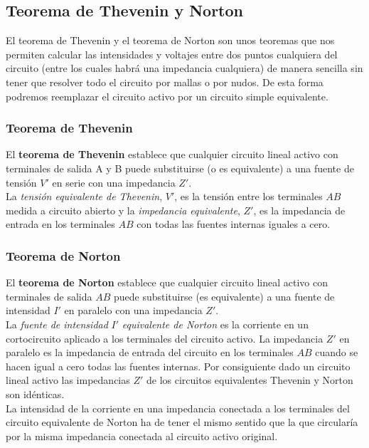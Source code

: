 \documentclass[12pt,a4paper]{article}
\begin{document}
\subsection{Teorema de Thevenin y Norton}

El teorema de Thevenin y el teorema de Norton son unos teoremas que nos permiten calcular las intensidades y voltajes entre dos puntos cualquiera del circuito (entre los cuales habrá una impedancia cualquiera) de manera sencilla sin tener que resolver todo el circuito por mallas o por nudos. De esta forma podremos reemplazar el circuito activo por un circuito simple equivalente. 

\subsubsection{Teorema de Thevenin}

El \textbf{teorema de Thevenin} establece que cualquier circuito lineal activo con terminales de salida A y B puede substituirse (o es equivalente) a una fuente de tensión $V'$ en serie con una impedancia $Z'$. \\

La \textit{tensión equivalente de Thevenin}, $V'$, es la tensión entre los terminales $AB$ medida a circuito abierto y la \textit{impedancia equivalente}, $Z'$, es la impedancia de entrada en los terminales $AB$ con todas las fuentes internas iguales a cero.

\subsubsection{Teorema de Norton}

El \textbf{teorema de Norton} establece que cualquier circuito lineal activo con terminales de salida $AB$ puede substituirse (es equivalente) a una fuente de intensidad $I'$ en paralelo con una impedancia $Z'$. \\

La \textit{fuente de intensidad} $I'$ \textit{equivalente de Norton} es la corriente en un cortocircuito aplicado a los terminales del circuito activo. La impedancia $Z'$ en paralelo es la impedancia de entrada del circuito en los terminales $AB$ cuando se hacen igual a cero todas las fuentes internas. Por consiguiente dado un circuito lineal activo las impedancias $Z'$ de los circuitos equivalentes Thevenin y Norton son idénticas. \\

La intensidad de la corriente en una impedancia conectada a los terminales del circuito equivalente de Norton ha de tener el mismo sentido que la que circularía por la misma impedancia conectada al circuito activo original.
\end{document}
